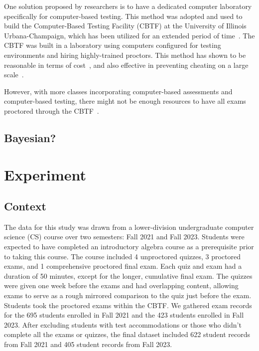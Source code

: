 \documentclass[review,sigconf]{acmart}
\begin{document}
One solution proposed by researchers is to have a dedicated computer laboratory specifically for computer-based testing. 
This method was adopted and used to build the Computer-Based Testing Facility (CBTF) at the University of Illinois Urbana-Champaign, which has been utilized for an extended period of time~\cite{zilles2015cbtf}. 
The CBTF was built in a laboratory using computers configured for testing environments and hiring highly-trained proctors. 
This method has shown to be reasonable in terms of cost~\cite{zilles2015cbtf}, and also effective in preventing cheating on a large scale~\cite{silva2020measuring}. 

However, with more classes incorporating computer-based assessments and computer-based testing, there might not be enough resources to have all exams proctored through the CBTF~\cite{mcmahon2022lessons}. 

\subsection{Bayesian?}

\section{Experiment}
\subsection{Context}
The data for this study was drawn from a lower-division undergraduate computer science (CS) course over two semesters: Fall 2021 and Fall 2023.
Students were expected to have completed an introductory algebra course as a prerequisite prior to taking this course.
The course included 4 unproctored quizzes, 3 proctored exams, and 1 comprehensive proctored final exam.
Each quiz and exam had a duration of 50 minutes, except for the longer, cumulative final exam.
The quizzes were given one week before the exams and had overlapping content, allowing exams to serve as a rough mirrored comparison to the quiz just before the exam.
Students took the proctored exams within the CBTF. %
We gathered exam records for the 695 students enrolled in Fall 2021 and the 423 students enrolled in Fall 2023.
After excluding students with test accommodations or those who didn't complete all the exams or quizzes, the final dataset included 622 student records from Fall 2021 and 405 student records from Fall 2023.
\end{document}
